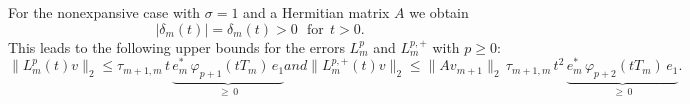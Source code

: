 \documentclass[smallextended]{svjour3pre}%
\numberwithin{equation}{section}
\numberwithin{figure}{section}
\numberwithin{table}{section}
\newcommand\tjnew[1]{{#1}}
\newcommand\phif\varphi
\newcommand\sca{\sigma}
\newcommand\Opgen{A}
\begin{document}
\begin{proposition}\label{upperboundphi}
\tjnew{For the nonexpansive case} with $\sca=1$ and \tjnew{a Hermitian} matrix $\Opgen$ we obtain
\begin{equation*}
|\delta_m(t)| = \delta_m(t) > 0 ~~~\text{for}~~t > 0.
\end{equation*}
This leads to the following upper bounds for the errors $L^p_m$ and $L^{p,+}_m$ with $p\geq 0$:
\begin{subequations}
\begin{equation}\label{hermitianphiestimate1}
\|L^p_m(t)v\|_2 \leq \tau_{m+1,m} \, t \, \underbrace{e_m^\ast \, \phif_{p+1}(tT_m) \, e_1}_{\geq\, 0}
\end{equation}
and
\begin{equation}\label{hermitianphiestimate2}
\|L^{p,+}_m(t)v\|_2 \leq \|\Opgen v_{m+1}\|_2 \,\tau_{m+1,m} \, t^2 \, \underbrace{e_m^\ast \, \phif_{p+2}(tT_m) \, e_1}_{\geq\, 0}.
\end{equation}
\end{subequations}
\end{proposition}
\end{document}
